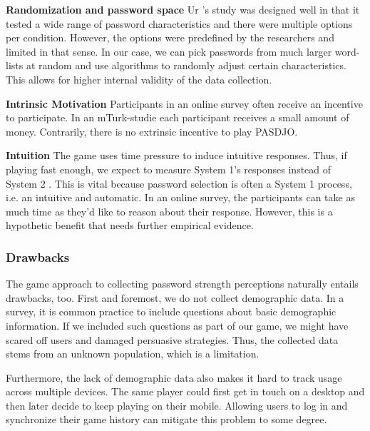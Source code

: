 \vspace*{1ex}
\noindent\textbf{Randomization and password space} Ur \etal's study was designed well in that it tested a wide range of password characteristics and there were multiple options per condition. However, the options were predefined by the researchers and limited in that sense. In our case, we can pick passwords from much larger word-lists at random and use algorithms to randomly adjust certain characteristics. This allows for higher internal validity of the data collection.

\vspace*{1ex}
\noindent\textbf{Intrinsic Motivation} Participants in an online survey often receive an incentive to participate. In an \gls{mTurk}-studie each participant receives a small amount of money. Contrarily, there is no extrinsic incentive to play PASDJO. 

\vspace*{1ex}
\noindent\textbf{Intuition} The game uses time pressure to induce intuitive responses. Thus, if playing fast enough, we expect to measure System 1's responses instead of System 2 \cite{Kahnemann2011FastAndSlow}. This is vital because password selection is often a System 1 process, i.e. an intuitive and automatic. In an online survey, the participants can take as much time as they'd like to reason about their response. However, this is a hypothetic benefit that needs further empirical evidence. 

\subsubsection{Drawbacks}
The game approach to collecting password strength perceptions naturally entails drawbacks, too. First and foremost, we do not collect demographic data. In a survey, it is common practice to include questions about basic demographic information. If we included such questions as part of our game, we might have scared off users and damaged persuasive strategies. Thus, the collected data stems from an unknown population, which is a limitation. %

Furthermore, the lack of demographic data also makes it hard to track usage across multiple devices. The same player could first get in touch on a desktop and then later decide to keep playing on their mobile. Allowing users to log in and synchronize their game history can mitigate this problem to some degree.

